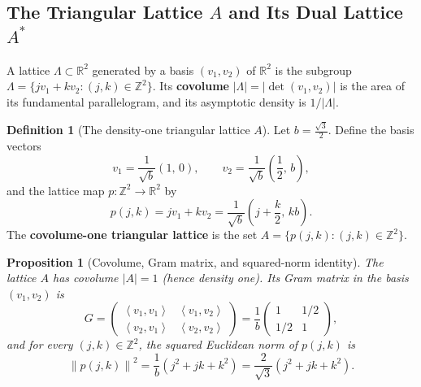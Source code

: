 \documentclass[11pt, a4paper]{article}
\newtheorem{proposition}[theorem]{Proposition}
\theoremstyle{definition}
\newtheorem{definition}[theorem]{Definition}
\theoremstyle{remark}
\newcommand{\R}{\mathbb{R}}
\newcommand{\Z}{\mathbb{Z}}
\newcommand{\norm}[1]{\left\lVert #1 \right\rVert}
\newcommand{\abs}[1]{\left\lvert #1 \right\rvert}
\newcommand{\inner}[2]{\left\langle #1, #2 \right\rangle}
\begin{document}
\subsection{The Triangular Lattice $A$ and Its Dual Lattice $A^*$}

A lattice $\Lambda \subset \R^2$ generated by a basis $(v_1, v_2)$ of $\R^2$ is the subgroup $\Lambda = \{j v_1 + k v_2 : (j, k) \in \Z^2\}$. Its \textbf{covolume} $\abs{\Lambda} = \abs{\det(v_1, v_2)}$ is the area of its fundamental parallelogram, and its asymptotic density is $1/\abs{\Lambda}$.

\begin{definition}[The density-one triangular lattice $A$]
Let $b = \frac{\sqrt{3}}{2}$. Define the basis vectors
\[
v_1 = \frac{1}{\sqrt{b}}\left(1, \, 0\right), \qquad v_2 = \frac{1}{\sqrt{b}}\left(\frac{1}{2}, \, b\right),
\]
and the lattice map $p : \Z^2 \to \R^2$ by
\[
p(j, k) = j v_1 + k v_2 = \frac{1}{\sqrt{b}}\left(j + \frac{k}{2}, \, k b\right).
\]
The \textbf{covolume-one triangular lattice} is the set $A = \{p(j, k) : (j, k) \in \Z^2\}$.
\end{definition}

\begin{proposition}[Covolume, Gram matrix, and squared-norm identity]
\label{prop:gram}
The lattice $A$ has covolume $\abs{A} = 1$ (hence density one). Its Gram matrix in the basis $(v_1, v_2)$ is
\[
G = \begin{pmatrix} \inner{v_1}{v_1} & \inner{v_1}{v_2} \\ \inner{v_2}{v_1} & \inner{v_2}{v_2} \end{pmatrix} = \frac{1}{b} \begin{pmatrix} 1 & 1/2 \\ 1/2 & 1 \end{pmatrix},
\]
and for every $(j, k) \in \Z^2$, the squared Euclidean norm of $p(j, k)$ is
\begin{equation}
\label{eq:norm_sq}
\norm{p(j, k)}^2 = \frac{1}{b}\left(j^2 + j k + k^2\right) = \frac{2}{\sqrt{3}}\left(j^2 + j k + k^2\right).
\end{equation}
\end{proposition}
\end{document}
